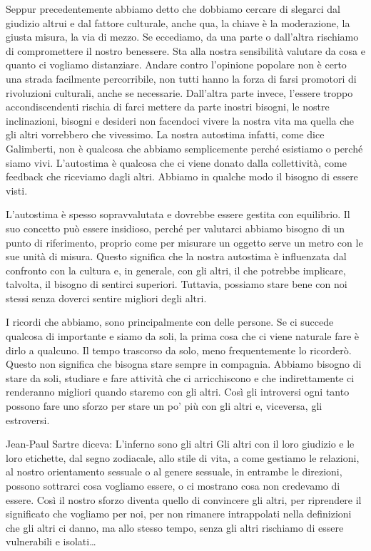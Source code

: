 \documentclass[12pt]{book} %
\begin{document}
Seppur precedentemente abbiamo detto che dobbiamo cercare di slegarci dal giudizio altrui e dal fattore culturale, anche
qua, la chiave è la moderazione, la giusta misura, la via di mezzo. Se eccediamo, da una parte o
dall'altra rischiamo di compromettere il nostro benessere. Sta alla nostra
sensibilità valutare da cosa e quanto ci vogliamo distanziare. Andare contro l'opinione popolare non è
certo una strada facilmente percorribile, non tutti hanno la forza di farsi promotori di rivoluzioni culturali, anche
se necessarie. Dall'altra parte invece, l'essere troppo accondiscendenti
rischia di farci mettere da parte inostri bisogni, le nostre inclinazioni, bisogni e desideri non facendoci
vivere la nostra vita ma quella che gli altri vorrebbero che vivessimo. La nostra autostima infatti, come dice
Galimberti, non è qualcosa che abbiamo semplicemente perché esistiamo o perché siamo vivi.
L'autostima è qualcosa che ci viene donato dalla collettività, come feedback che riceviamo dagli
altri. Abbiamo in qualche modo il bisogno di essere visti.

L'autostima è spesso sopravvalutata e dovrebbe essere gestita con equilibrio. Il suo concetto può essere insidioso, perché per valutarci abbiamo bisogno di un punto di riferimento, proprio come per misurare un oggetto serve un metro con le sue unità di misura. Questo significa che la nostra autostima è influenzata dal confronto con la cultura e, in generale, con gli altri, il che potrebbe implicare, talvolta, il bisogno di sentirci superiori.
Tuttavia, possiamo stare bene con noi stessi senza doverci sentire migliori degli altri.

I ricordi che abbiamo, sono principalmente con delle persone. Se ci succede qualcosa di importante e siamo da soli, la prima cosa che ci viene naturale fare è dirlo a qualcuno. Il tempo trascorso da solo, meno frequentemente lo ricorderò. Questo non significa che bisogna stare sempre in compagnia. Abbiamo bisogno di stare da soli, studiare e fare attività che ci arricchiscono e che indirettamente ci renderanno migliori quando staremo con gli altri. Così gli introversi ogni tanto possono fare uno sforzo per stare un po' più con gli altri e, viceversa, gli estroversi.

Jean-Paul Sartre diceva: L'inferno sono gli altri
Gli altri con il loro giudizio e le loro etichette, dal segno zodiacale, allo stile di vita, a come gestiamo le relazioni, al nostro orientamento sessuale o al genere sessuale, in entrambe le direzioni, possono sottrarci cosa vogliamo essere, o ci mostrano cosa non credevamo di essere. Così il nostro sforzo diventa quello di convincere gli altri, per riprendere il significato che vogliamo per noi, per non rimanere intrappolati nella definizioni che gli altri ci danno, ma allo stesso tempo, senza gli altri rischiamo di essere vulnerabili e isolati…
\end{document}
